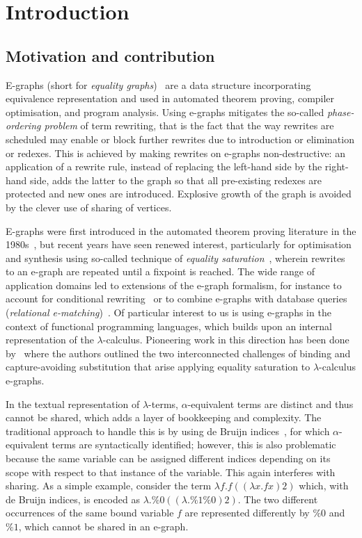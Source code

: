 \section{Introduction}
\label{sec:introduction}

\subsection{Motivation and contribution}

E-graphs (short for \emph{equality graphs})~\cite{EggPaper} are a data structure incorporating equivalence representation and used in automated theorem proving, compiler optimisation, and program analysis. 
Using e-graphs mitigates the so-called \emph{phase-ordering problem} of term rewriting, that is the fact that the way rewrites are scheduled may enable or block further rewrites due to introduction or elimination or redexes. 
This is achieved by making rewrites on e-graphs non-destructive: an application of a rewrite rule, instead of replacing the left-hand side by the right-hand side, adds the latter to the graph so that all pre-existing redexes are protected and new ones are introduced. 
Explosive growth of the graph is avoided by the clever use of sharing of vertices. 

E-graphs were first introduced in the automated theorem proving literature in the 1980s~\cite{nelson1980techniques}, but recent years have seen renewed interest, particularly for optimisation and synthesis using so-called technique of \emph{equality saturation}~\cite{10.1145/1594834.1480915, griggio_proceedings_2022, EggPaper,flatt_small_2022}, wherein rewrites to an e-graph are repeated until a fixpoint is reached. 
The wide range of application domains led to extensions of the e-graph formalism, for instance to account for conditional rewriting~\cite{singher2023colored} or  to combine e-graphs with database queries (\emph{relational e-matching})~\cite{zhang_relational_2022}.
Of particular interest to us is using e-graphs in the context of functional programming languages, which builds upon an internal representation of the $\lambda$-calculus. 
Pioneering work in this direction has been done by~\cite{koehler2022sketchguided} where
the authors outlined the two interconnected challenges of binding and capture-avoiding substitution that arise applying equality saturation to $\lambda$-calculus e-graphs.

In the textual representation of $\lambda$-terms, $\alpha$-equivalent terms are distinct and thus cannot be shared, which adds a layer of bookkeeping and complexity.
The traditional approach to handle this is by using de Bruijn indices~\cite{de1972lambda}, for which $\alpha$-equivalent terms are syntactically identified; however, this is also problematic because the same variable can be assigned different indices depending on its scope with respect to that instance of the variable.
This again interferes with sharing. 
As a simple example, consider the term $\lambda f . f ((\lambda x . f x) 2)$ which, with de Bruijn indices,  is encoded as $\lambda . \%0 ((\lambda . \%1 \%0) 2)$.
The two different occurrences of the same bound variable $f$ are represented differently by $\%0$ and $\%1$, which cannot be shared in an e-graph.


